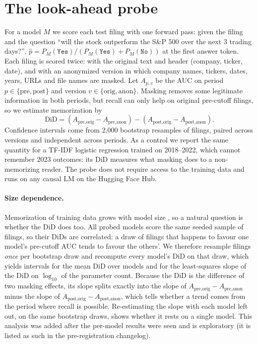 \documentclass{article}
\begin{document}
\section{The look-ahead probe}
\label{sec:probe}

For a model $M$ we score each test filing with one forward pass: given the filing and the question ``will the stock
outperform the S\&P 500 over the next 3 trading days?'', $\hat p = P_M(\texttt{Yes})/(P_M(\texttt{Yes})+P_M(\texttt{No}))$
at the first answer token. Each filing is scored twice: with the original text and header (company, ticker, date),
and with an anonymized version in which company names, tickers, dates, years, URLs and file names are masked.
Let $A_{p,v}$ be the AUC on period $p\in\{\text{pre},\text{post}\}$ and version $v\in\{\text{orig},\text{anon}\}$.
Masking removes some legitimate information in both periods, but recall can only help on original pre-cutoff
filings, so we estimate memorization by
\begin{equation}
  \mathrm{DiD} = (A_{\text{pre},\text{orig}} - A_{\text{pre},\text{anon}}) - (A_{\text{post},\text{orig}} - A_{\text{post},\text{anon}}).
\end{equation}
Confidence intervals come from 2{,}000 bootstrap resamples of filings, paired across versions and independent across
periods. As a control we report the same quantity for a TF-IDF logistic regression trained on 2018--2022, which cannot
remember 2023 outcomes: its DiD measures what masking does to a non-memorizing reader. The probe does not require
access to the training data and runs on any causal LM on the Hugging Face Hub.

\paragraph{Size dependence.}
Memorization of training data grows with model size \citep{carlini2023quantifying}, so a natural question is whether
the DiD does too. All probed models score the same seeded sample of filings, so their DiDs are correlated: a draw of
filings that happens to favour one model's pre-cutoff AUC tends to favour the others'. We therefore resample filings
\emph{once} per bootstrap draw and recompute every model's DiD on that draw, which yields intervals for the mean DiD
over models and for the least-squares slope of the DiD on $\log_{10}$ of the parameter count. Because the DiD is the
difference of two masking effects, its slope splits exactly into the slope of
$A_{\text{pre},\text{orig}}-A_{\text{pre},\text{anon}}$ minus the slope of $A_{\text{post},\text{orig}}-A_{\text{post},\text{anon}}$,
which tells whether a trend comes from the period where recall is possible. Re-estimating the slope with each model
left out, on the same bootstrap draws, shows whether it rests on a single model. This analysis was added after the
per-model results were seen and is exploratory (it is listed as such in the pre-registration changelog).
\end{document}
